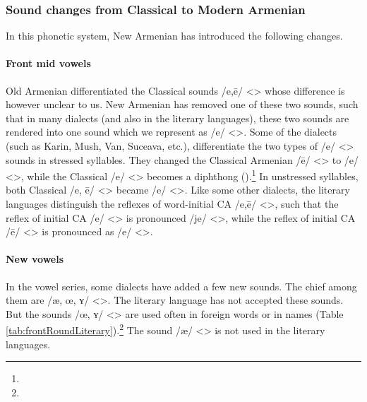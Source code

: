 \subsubsection{Sound changes from Classical to Modern Armenian}
In this phonetic system, New Armenian has introduced the following changes. 


\paragraph{Front mid vowels}\label{sec:IntroAdjarian:differences:phonetic:change:midvowelfront}

Old Armenian differentiated the Classical sounds /e,ē/ <> whose difference is however unclear to us. New Armenian has removed one of these two sounds, such that in many dialects (and also in the literary languages), these two sounds are rendered into one sound which we represent as /e/ <>. Some of the dialects (such as Karin, Mush, Van, Suceava, etc.), differentiate the two types of /e/ <> sounds in stressed syllables. They changed the Classical Armenian /ē/ <> to /e/ <>, while the Classical /e/ <> becomes a diphthong ().\footnote{} In unstressed syllables, both Classical /e, ē/ <> became /e/ <>. Like some other dialects, the literary languages distinguish the reflexes of word-initial CA /e,ē/ <>, such that the reflex of initial CA /e/ <> is pronounced /je/ <>, while the reflex of initial CA /ē/ <> is pronounced as /e/ <>. 





\begin{adjarianpage}\label{page:16}\end{adjarianpage}%

\paragraph{New vowels}


In the vowel series, some dialects have added a few new sounds. The chief among them are /æ, œ, ʏ/ <>. The literary language has not accepted these sounds. But the sounds /œ, ʏ/ <> are used often in foreign words or in names (Table \ref{tab:frontRoundLiterary}).\footnote{} The sound /æ/ <> is not used in the literary languages.

